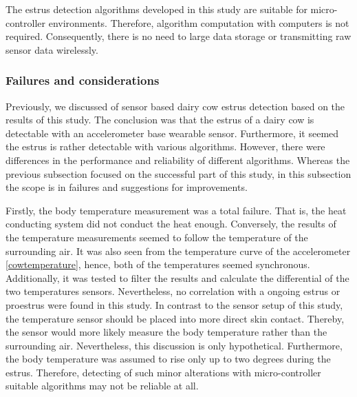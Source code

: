 \documentclass[english,12pt,a4paper,pdftex,elec,utf8]{aaltothesis}
\begin{document}
The estrus detection algorithms developed in this study are suitable for micro-controller environments. Therefore, algorithm computation with computers is not required. Consequently, there is no need to large data storage or transmitting raw sensor data wirelessly.


\subsubsection{Failures and considerations}

Previously, we discussed of sensor based dairy cow estrus detection based on the results of this study. The conclusion was that the estrus of a dairy cow is detectable with an accelerometer base wearable sensor. Furthermore, it seemed the estrus is rather detectable with various algorithms. However, there were differences in the performance and reliability of different algorithms. Whereas the previous subsection focused on the successful part of this study, in this subsection the scope is in failures and suggestions for improvements.

Firstly, the body temperature measurement was a total failure. That is, the heat conducting system did not conduct the heat enough. Conversely, the results of the temperature measurements seemed to follow the temperature of the surrounding air. It was also seen from the temperature curve of the accelerometer \ref{cowtemperature}, hence, both of the temperatures seemed synchronous. Additionally, it was tested to filter the results and calculate the differential of the two temperatures sensors. Nevertheless, no correlation with a ongoing estrus or proestrus were found in this study. In contrast to the sensor setup of this study, the temperature sensor should be placed into more direct skin contact. Thereby, the sensor would more likely measure the body temperature rather than the surrounding air. Nevertheless, this discussion is only hypothetical. Furthermore, the body temperature was assumed to rise only up to two degrees during the estrus. Therefore, detecting of such minor alterations with micro-controller suitable algorithms may not be reliable at all.
\end{document}
